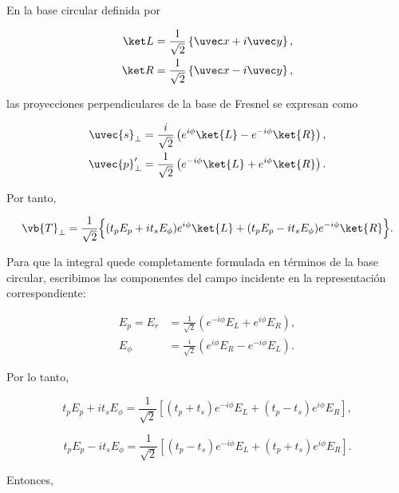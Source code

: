 En la base circular definida por

\begin{equation}
\begin{aligned}
  \ket L
  &=
  \frac{1}{\sqrt 2}
  \left\{
  \uvec x + i \uvec y
  \right\},
  \\
  \ket R
  &=
  \frac{1}{\sqrt 2}
  \left\{
  \uvec x - i \uvec y
  \right\},
  \label{eq:def_of_circular_basis}
\end{aligned}
\end{equation}

las proyecciones perpendiculares de la base de Fresnel se expresan como

\begin{align}
\uvec{s}_\perp
&=
\frac{i}{\sqrt{2}}
\left(
e^{i\phi}\ket{L}
-
e^{-i\phi}\ket{R}
\right),
\\
\uvec{p}'_\perp
&=
\frac{1}{\sqrt{2}}
\left(
e^{-i\phi}\ket{L}
+
e^{i\phi}\ket{R}
\right).
\end{align}

Por tanto,

\begin{equation}
\vb{T}_\perp
=
\frac{1}{\sqrt{2}}
\Big\{
(t_p E_p + i t_s E_\phi)e^{i\phi}\ket{L}
+
(t_p E_p - i t_s E_\phi)e^{-i\phi}\ket{R}
\Big\}.
\end{equation}

Para que la integral quede completamente formulada en términos de la base circular, escribimos las componentes del campo incidente en la representación correspondiente:

\begin{align}
E_p = E_r
&=
\frac{1}{\sqrt{2}}
\left(
e^{-i\phi}E_L
+
e^{i\phi}E_R
\right),
\label{eq:Ep_in_LR_basis}
\\
E_\phi
&=
\frac{i}{\sqrt{2}}
\left(
e^{i\phi}E_R
-
e^{-i\phi}E_L
\right).
\label{eq:Ephi_in_LR_basis}
\end{align}

Por lo tanto,

\begin{equation}
t_pE_p+i t_sE_\phi
=
\frac{1}{\sqrt2}
\left[
(t_p+t_s)e^{-i\phi}E_L
+
(t_p-t_s)e^{i\phi}E_R
\right],
\end{equation}

\begin{equation}
t_pE_p-i t_sE_\phi
=
\frac{1}{\sqrt2}
\left[
(t_p-t_s)e^{-i\phi}E_L
+
(t_p+t_s)e^{i\phi}E_R
\right].
\end{equation}

Entonces,

